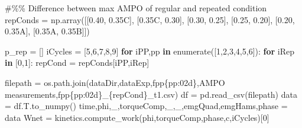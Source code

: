 \documentclass[
  11pt,
  a4paper]{article}
\newenvironment{Shaded}{\begin{snugshade}}{\end{snugshade}}
\newcommand{\BuiltInTok}[1]{\textcolor[rgb]{0.00,0.23,0.31}{#1}}
\newcommand{\CommentTok}[1]{\textcolor[rgb]{0.37,0.37,0.37}{#1}}
\newcommand{\ControlFlowTok}[1]{\textcolor[rgb]{0.00,0.23,0.31}{\textbf{#1}}}
\newcommand{\DecValTok}[1]{\textcolor[rgb]{0.68,0.00,0.00}{#1}}
\newcommand{\KeywordTok}[1]{\textcolor[rgb]{0.00,0.23,0.31}{\textbf{#1}}}
\newcommand{\NormalTok}[1]{\textcolor[rgb]{0.00,0.23,0.31}{#1}}
\newcommand{\OperatorTok}[1]{\textcolor[rgb]{0.37,0.37,0.37}{#1}}
\newcommand{\SpecialCharTok}[1]{\textcolor[rgb]{0.37,0.37,0.37}{#1}}
\newcommand{\SpecialStringTok}[1]{\textcolor[rgb]{0.13,0.47,0.30}{#1}}
\newcommand{\StringTok}[1]{\textcolor[rgb]{0.13,0.47,0.30}{#1}}
\begin{document}
\begin{Shaded}
\begin{Highlighting}[]
\CommentTok{\#\%\% Difference between max AMPO of regular and repeated condition}
\NormalTok{repConds }\OperatorTok{=}\NormalTok{ np.array([[}\StringTok{\textquotesingle{}0.40\textquotesingle{}}\NormalTok{, }\StringTok{\textquotesingle{}0.35C\textquotesingle{}}\NormalTok{],}
\NormalTok{                    [}\StringTok{\textquotesingle{}0.35C\textquotesingle{}}\NormalTok{, }\StringTok{\textquotesingle{}0.30\textquotesingle{}}\NormalTok{],}
\NormalTok{                    [}\StringTok{\textquotesingle{}0.30\textquotesingle{}}\NormalTok{, }\StringTok{\textquotesingle{}0.25\textquotesingle{}}\NormalTok{],}
\NormalTok{                    [}\StringTok{\textquotesingle{}0.25\textquotesingle{}}\NormalTok{, }\StringTok{\textquotesingle{}0.20\textquotesingle{}}\NormalTok{],}
\NormalTok{                    [}\StringTok{\textquotesingle{}0.20\textquotesingle{}}\NormalTok{, }\StringTok{\textquotesingle{}0.35A\textquotesingle{}}\NormalTok{],}
\NormalTok{                    [}\StringTok{\textquotesingle{}0.35A\textquotesingle{}}\NormalTok{, }\StringTok{\textquotesingle{}0.35B\textquotesingle{}}\NormalTok{]])}

\NormalTok{p\_rep }\OperatorTok{=}\NormalTok{ []}
\NormalTok{iCycles }\OperatorTok{=}\NormalTok{ [}\DecValTok{5}\NormalTok{,}\DecValTok{6}\NormalTok{,}\DecValTok{7}\NormalTok{,}\DecValTok{8}\NormalTok{,}\DecValTok{9}\NormalTok{]}
\ControlFlowTok{for}\NormalTok{ iPP,pp }\KeywordTok{in} \BuiltInTok{enumerate}\NormalTok{([}\DecValTok{1}\NormalTok{,}\DecValTok{2}\NormalTok{,}\DecValTok{3}\NormalTok{,}\DecValTok{4}\NormalTok{,}\DecValTok{5}\NormalTok{,}\DecValTok{6}\NormalTok{]):}
    \ControlFlowTok{for}\NormalTok{ iRep }\KeywordTok{in}\NormalTok{ [}\DecValTok{0}\NormalTok{,}\DecValTok{1}\NormalTok{]:}
\NormalTok{        repCond }\OperatorTok{=}\NormalTok{ repConds[iPP,iRep]}
        
\NormalTok{        filepath }\OperatorTok{=}\NormalTok{ os.path.join(dataDir,}\StringTok{\textquotesingle{}dataExp\textquotesingle{}}\NormalTok{,}\SpecialStringTok{f\textquotesingle{}pp}\SpecialCharTok{\{}\NormalTok{pp}\SpecialCharTok{:02d\}}\SpecialStringTok{\textquotesingle{}}\NormalTok{,}\StringTok{\textquotesingle{}AMPO measurements\textquotesingle{}}\NormalTok{,}\SpecialStringTok{f\textquotesingle{}pp}\SpecialCharTok{\{}\NormalTok{pp}\SpecialCharTok{:02d\}}\SpecialStringTok{\_}\SpecialCharTok{\{}\NormalTok{repCond}\SpecialCharTok{\}}\SpecialStringTok{\_t1.csv\textquotesingle{}}\NormalTok{)}
\NormalTok{        df }\OperatorTok{=}\NormalTok{ pd.read\_csv(filepath)}
\NormalTok{        data }\OperatorTok{=}\NormalTok{ df.T.to\_numpy()}
\NormalTok{        time,phi,\_,torqueComp,\_,\_,emgQuad,emgHams,phase }\OperatorTok{=}\NormalTok{ data}
\NormalTok{        Wnet }\OperatorTok{=}\NormalTok{ kinetics.compute\_work(phi,torqueComp,phase,}\StringTok{\textquotesingle{}c\textquotesingle{}}\NormalTok{,iCycles)[}\DecValTok{0}\NormalTok{]}
        

\end{Highlighting}
\end{Shaded}
\end{document}

